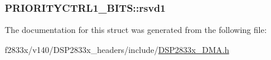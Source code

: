 \subsubsection[{rsvd1}]{ P\+R\+I\+O\+R\+I\+T\+Y\+C\+T\+R\+L1\+\_\+\+B\+I\+T\+S\+::rsvd1}\label{struct_p_r_i_o_r_i_t_y_c_t_r_l1___b_i_t_s_a03c77efef280f7fd3c2538a8c823d3f1}


The documentation for this struct was generated from the following file\+:\begin{DoxyCompactItemize}
\item 
f2833x/v140/\+D\+S\+P2833x\+\_\+headers/include/\hyperlink{_d_s_p2833x___d_m_a_8h}{D\+S\+P2833x\+\_\+\+D\+M\+A.\+h}\end{DoxyCompactItemize}
